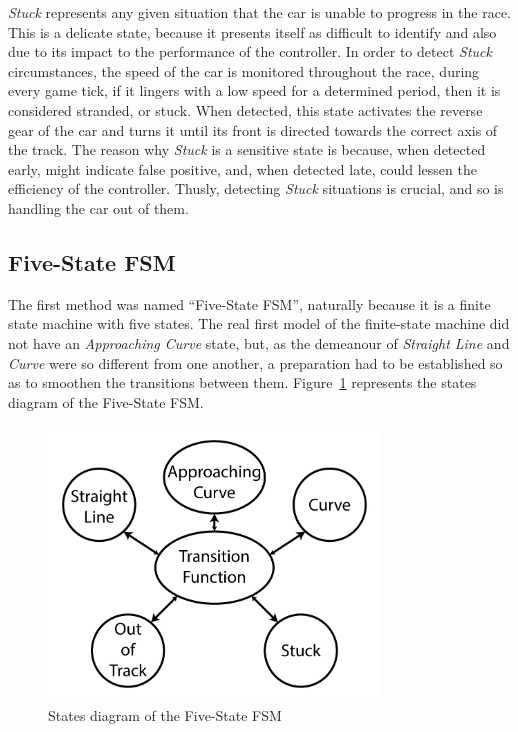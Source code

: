 	\emph{Stuck} represents any given situation that the car is unable to progress in the race. This is a delicate state, because it presents itself as difficult to identify and also due to its impact to the performance of the controller. In order to detect \emph{Stuck} circumstances, the speed of the car is monitored throughout the race, during every game tick, if it lingers with a low speed for a determined period, then it is considered stranded, or stuck. When detected, this state activates the reverse gear of the car and turns it until its front is directed towards the correct axis of the track. The reason why \emph{Stuck} is a sensitive state is because, when detected early, might indicate false positive, and, when detected late, could lessen the efficiency of the controller. Thusly, detecting \textit{Stuck} situations is crucial, and so is handling the car out of them.
	
\subsection{Five-State FSM} \label{subsec:FSM5}

	The first method was named ``Five-State FSM'', naturally because it is a finite state machine with five states. The real first model of the finite-state machine did not have an \emph{Approaching Curve} state, but, as the demeanour of \emph{Straight Line} and \emph{Curve} were so different from one another, a preparation had to be established so as to smoothen the transitions between them. Figure~\ref{Fig:FSM5Diagram} represents the states diagram of the Five-State FSM.
	
	\begin{figure}[h]
		
		\centering
		\includegraphics[width=250pt]{FiveStateFSM}
		\caption{States diagram of the Five-State FSM}
		\label{Fig:FSM5Diagram}
		
	\end{figure}
	
